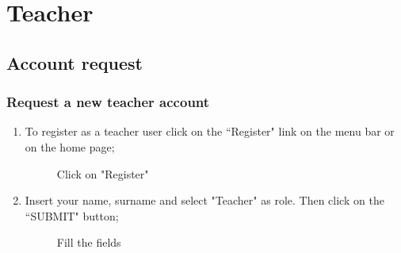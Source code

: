 \documentclass[ManualeUtente]{subfiles}
\begin{document}
\chapter{Teacher}
\section{Account request}
\subsection{Request a new teacher account}
\begin{enumerate}
	\item To register as a teacher user click on the \textquotedblleft Register" link on the menu bar or on the home page;
	\begin{figure}[H]
		\centering
		\caption{Click on "Register"}
		\label{fig:Click on "Register"}
	\end{figure} \newpage
	\item Insert your name, surname and select "Teacher" as role. Then click on the \textquotedblleft SUBMIT" button;
	\begin{figure}[H]
		\centering
		\caption{Fill the fields}
		\label{fig:Fill the fields}
	\end{figure}
	
\end{enumerate}
\newpage
\end{document}

